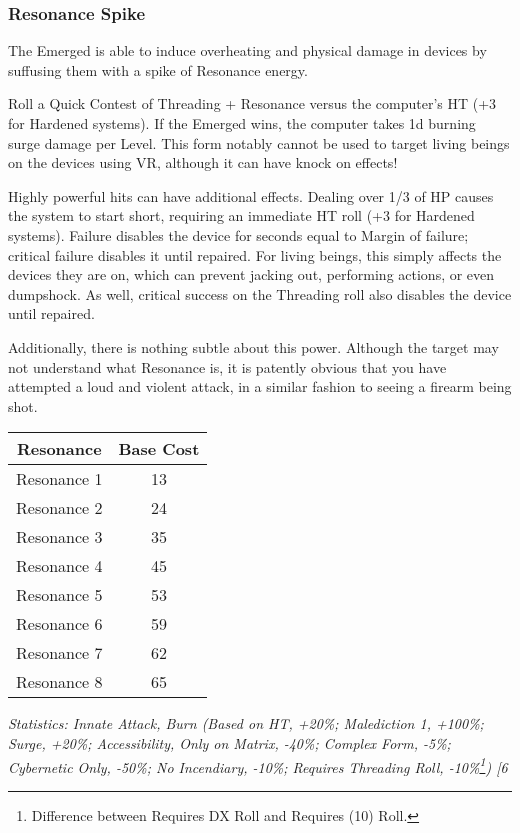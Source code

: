 \begin{multicols*}{3}
	\subsubsection*{Resonance Spike}\label{resonance_spike}
	
	The Emerged is able to induce overheating and physical damage in devices by suffusing them with a spike of Resonance energy.
	
	Roll a Quick Contest of Threading + Resonance versus the computer's HT (+3 for Hardened systems). If the Emerged wins, the computer takes 1d burning surge damage per Level. This form notably cannot be used to target living beings on the devices using VR, although it can have knock on effects!
	
	Highly powerful hits can have additional effects. Dealing over 1/3 of HP causes the system to start short, requiring an immediate HT roll (+3 for Hardened systems). Failure disables the device for seconds equal to Margin of failure; critical failure disables it until repaired. For living beings, this simply affects the devices they are on, which can prevent jacking out, performing actions, or even dumpshock. As well, critical success on the Threading roll also disables the device until repaired.
	
	Additionally, there is nothing subtle about this power. Although the target may not understand what Resonance is, it is patently obvious that you have attempted a loud and violent attack, in a similar fashion to seeing a firearm being shot.
	
	\begin{center}
		\begin{tabular}{|c|c|}
			\hline
			Resonance & Base Cost\\
			\hline
			\hline
			Resonance 1 & 13 \\
			Resonance 2 & 24 \\
			Resonance 3 & 35 \\
			Resonance 4 & 45 \\
			Resonance 5 & 53 \\
			Resonance 6 & 59 \\
			Resonance 7 & 62 \\
			Resonance 8 & 65 \\
			\hline
		\end{tabular}
	\end{center}
	
	\textcolor{OliveGreen}{\textit{Statistics: Innate Attack, Burn (Based on HT, +20\%; Malediction 1, +100\%; Surge, +20\%; Accessibility, Only on Matrix, -40\%; Complex Form, -5\%; Cybernetic Only, -50\%; No Incendiary, -10\%; Requires Threading Roll, -10\%\footnote{Difference between Requires DX Roll and Requires (10) Roll.}) [6}}
	

\end{multicols*}
